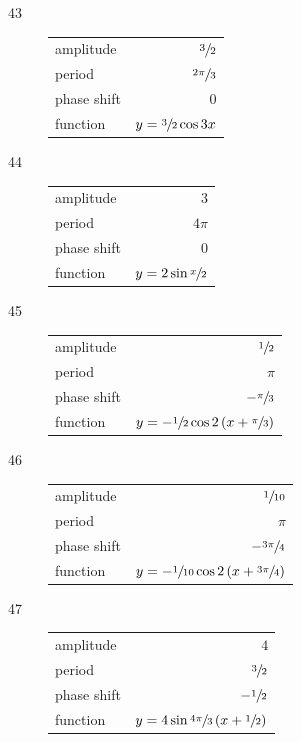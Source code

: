\documentclass{exam}
\begin{document}
\begin{description}
    \item[43]
      \begin{tabular}[H]{lr}
        \toprule
        amplitude   & $\sfrac{3}{2}$ \\
        period      & $\sfrac{2 \pi}{3}$ \\
        phase shift & $0$ \\
        function    & $y = \sfrac{3}{2} \cos 3x$ \\
        \bottomrule
      \end{tabular}

    \item[44]
      \begin{tabular}[H]{lr}
        \toprule
        amplitude   & $3$ \\
        period      & $4 \pi$ \\
        phase shift & $0$ \\
        function    & $y = 2 \sin \sfrac{x}{2}$ \\
        \bottomrule
      \end{tabular}

    \item[45]
      \begin{tabular}[H]{lr}
        \toprule
        amplitude   & $\sfrac{1}{2}$ \\
        period      & $\pi$ \\
        phase shift & $- \sfrac{\pi}{3}$ \\
        function    & $y = - \sfrac{1}{2} \cos 2 \left( x + \sfrac{\pi}{3} \right)$ \\
        \bottomrule
      \end{tabular}

    \item[46]
      \begin{tabular}[H]{lr}
        \toprule
        amplitude   & $\sfrac{1}{10}$ \\
        period      & $\pi$ \\
        phase shift & $- \sfrac{3 \pi}{4}$ \\
        function    & $y = - \sfrac{1}{10} \cos 2 \left( x + \sfrac{3 \pi}{4} \right)$ \\
        \bottomrule
      \end{tabular}

    \item[47]
      \begin{tabular}[H]{lr}
        \toprule
        amplitude   & $4$ \\
        period      & $\sfrac{3}{2}$ \\
        phase shift & $- \sfrac{1}{2}$ \\
        function    & $y = 4 \sin \sfrac{4 \pi}{3} \left( x + \sfrac{1}{2} \right)$ \\
        \bottomrule
      \end{tabular}


\end{description}
\end{document}
